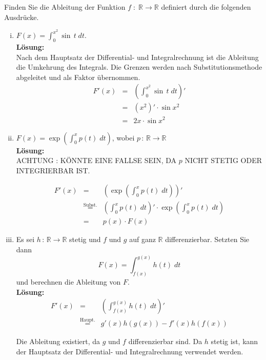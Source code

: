\documentclass[11pt,a4paper,ngerman]{article}
\begin{document}
Finden Sie die Ableitung der Funktion $f \; : \; \mathbb{R} \rightarrow \mathbb{R}$ definiert durch die folgenden Ausdrücke.

\begin{enumerate}[i)]
    \item $F(x) = \int_{0}^{x^2} \sin \, t \; dt$.\\

\textbf{Lösung:}\\

Nach dem Hauptsatz der Differential- und Integralrechnung ist die Ableitung die Umkehrung des Integrals. Die Grenzen werden nach Substitutionsmethode abgeleitet und als Faktor übernommen.
$$
\begin{array}{rcl}
F'(x)	&=& \left( \int_0^{x^2} \sin \, t \; dt\right)'\\
	&=& (x^2)' \cdot \sin x^2\\
	&=& 2x \cdot \sin x^2
\end{array}
$$

    
    \item $F(x) = \exp \left( \int_{0}^{x} p(t)\; dt\right)$, wobei $p \, : \, \mathbb{R} \rightarrow \mathbb{R}$\\

\textbf{Lösung:}\\

ACHTUNG : KÖNNTE EINE FALLSE SEIN, DA $p$ NICHT STETIG ODER INTEGRIERBAR IST.

$$
\begin{array}{rcl}
F'(x)	&=& \left( \exp \left( \int_0^x p(t) \; dt \right) \right)'\\
	&\stackrel{\text{Subst.}}{=}& \left( \int_0^x p(t) \; dt\right)' \cdot \exp \left( \int_0^x p(t) \; dt\right)\\
	&=& p(x) \cdot F(x)
\end{array}
$$

    \item Es sei $h \, : \, \mathbb{R} \rightarrow \mathbb{R}$ stetig und $f$ und $g$ auf ganz $\mathbb{R}$ differenzierbar. Setzten Sie dann
$$
    F(x) = \int_{f(x)}^{g(x)} h(t) \; dt
$$
und berechnen die Ableitung von $F$.\\

\textbf{Lösung:}\\

$$
\begin{array}{rcl}
F'(x)	&=& \left( \int_{f(x)}^{g(x)} h(t) \; dt \right)'\\
	&\stackrel{\text{Haupt.}}{=}& g'(x) h(g(x)) - f'(x) h (f(x))
\end{array}
$$

Die Ableitung existiert, da $g$ und $f$ differenzierbar sind. Da $h$ stetig ist, kann der Hauptsatz der Differential- und Integralrechnung verwendet werden.

\end{enumerate}
\end{document}
